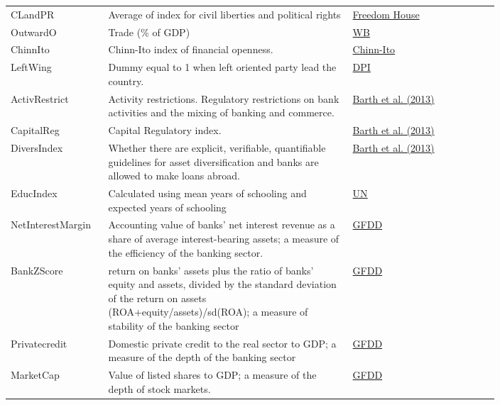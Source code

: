 \documentclass[preprint, nonatbib, 10pt]{elsarticle}
\begin{document}
\begin{center}
\begin{longtable}{l p{0.50\linewidth} p{0.3\linewidth}}
  CLandPR & Average of index for civil liberties and political rights & \href{https://freedomhouse.org/report/freedom-world-2016/methodology}{Freedom House} \\
  OutwardO & Trade (\% of GDP)  & \href{http://data.worldbank.org/indicator/NE.TRD.GNFS.ZS}{WB} \\
  ChinnIto & Chinn-Ito index of financial openness. & \href{http://web.pdx.edu/~ito/Chinn-Ito_website.htm}{Chinn-Ito} \\ 
  LeftWing & Dummy equal to 1 when left oriented party lead the country. & \href{http://www.nsd.uib.no/macrodataguide/set.html?id=11&sub=1}{DPI} \\
  ActivRestrict & Activity restrictions. Regulatory restrictions on bank activities and the mixing of banking and commerce. & \href{http://faculty.haas.berkeley.edu/ross_levine/regulation.htm}{Barth et al. (2013)} \\
  CapitalReg & Capital Regulatory index. & \href{http://faculty.haas.berkeley.edu/ross_levine/regulation.htm}{Barth et al. (2013)} \\
  DiversIndex & Whether there are explicit, verifiable, quantifiable guidelines for asset diversification and banks are allowed to make loans abroad. & \href{http://faculty.haas.berkeley.edu/ross_levine/regulation.htm}{Barth et al. (2013)} \\
  EducIndex & Calculated using mean years of schooling and expected years of schooling & \href{http://hdr.undp.org/en/content/education-index}{UN} \\
  NetInterestMargin & Accounting value of banks' net interest revenue as a share of average interest-bearing assets; a measure of the efficiency of the banking sector. & \href{http://data.worldbank.org/data-catalog/global-financial-development}{GFDD} \\
  BankZScore & return on banks' assets plus the ratio of banks' equity and assets, divided by the standard deviation of the return on assets (ROA+equity/assets)/sd(ROA); a measure of stability of the banking sector & \href{http://data.worldbank.org/data-catalog/global-financial-development}{GFDD} \\
  Privatecredit & Domestic private credit to the real sector to GDP; a measure of the depth of the banking sector & \href{http://data.worldbank.org/data-catalog/global-financial-development}{GFDD} \\
  MarketCap & Value of listed shares to GDP; a measure of the depth of stock markets.& \href{http://data.worldbank.org/data-catalog/global-financial-development}{GFDD} \\

\end{longtable}
\end{center}
\end{document}
